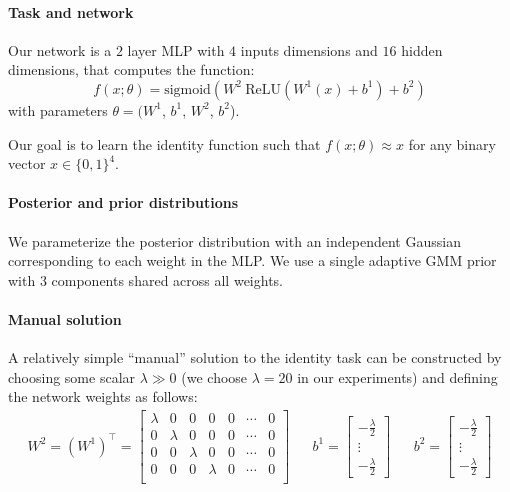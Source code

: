 \paragraph{Task and network}

Our network is a $2$ layer MLP with $4$ inputs dimensions and $16$ hidden dimensions, that computes the function:
\begin{equation}
    f(x;\theta) = \text{sigmoid}( W^2~\text{ReLU}(W^1(x) + b^1) + b^2)
\end{equation}
with parameters $\theta = (W^1$, $b^1$, $W^2$, $b^2$). 

Our goal is to learn the identity function such that $f(x;\theta) \approx x$ for any binary vector $x \in \{0, 1\}^4$.

\paragraph{Posterior and prior distributions} We parameterize the posterior distribution with an independent Gaussian corresponding to each weight in the MLP. We use a single adaptive GMM prior with 3 components shared across all weights.

\paragraph{Manual solution} A relatively simple ``manual'' solution to the identity task can be constructed by choosing some scalar $\lambda \gg 0$ (we choose $\lambda=20$ in our experiments) and defining the network weights as follows:
\begin{align*}
    W^2 = (W^1)^\top = 
\begin{bmatrix}
\lambda & 0 & 0 & 0 & 0 & \cdots & 0 \\
0 & \lambda & 0 & 0 & 0 & \cdots & 0 \\
0 & 0 & \lambda & 0 & 0 & \cdots & 0 \\
0 & 0 & 0 & \lambda & 0 & \cdots & 0 \\
\end{bmatrix}
&&
    b^1 =
\begin{bmatrix}
-\frac{\lambda}{2} \\
\vdots \\
-\frac{\lambda}{2}
\end{bmatrix}
&&
    b^2 =
\begin{bmatrix}
-\frac{\lambda}{2} \\
\vdots \\
-\frac{\lambda}{2}
\end{bmatrix}
\end{align*}

